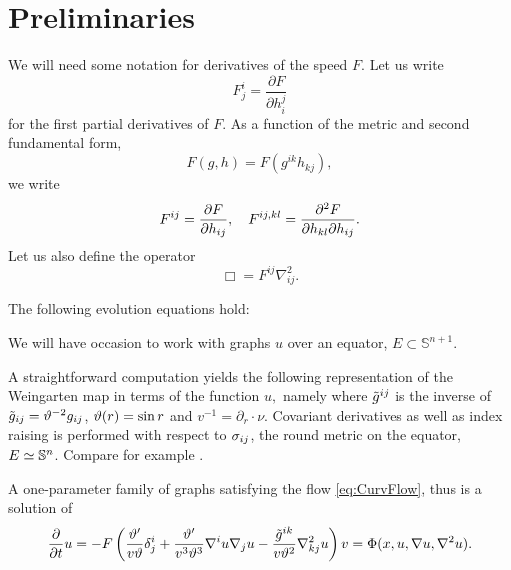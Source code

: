 \documentclass{amsart}
\begin{document}
\section{Preliminaries}\label{prelim}
\label{sec:prelim}

We will need some notation for derivatives of the speed \(F\). Let us write
\[
F^{i}_{j} = \frac{\partial F}{\partial h^{j}_{i}}
\]
for the first partial derivatives of \(F\). As a function of the metric and second fundamental form,
\[
F(g, h) = F(g^{ik} h_{kj}),
\]
we write
\[
F^{ij} = \frac{\partial F}{\partial h_{ij}}, \quad F^{ij,kl} = \fr{\partial^2F}{\partial h_{kl} \partial h_{ij}}.
\]
Let us also define the operator
\[
\Box = F^{ij} \nabla^2_{ij}.
\]
\begin{lemma} \label{lem: basi ev}
The following evolution equations hold:
\end{lemma}

We will have occasion to work with graphs \(u\) over an equator, \(E \subset \mathbb{S}^{n+1}\).

A straightforward computation yields the following representation of the Weingarten map in terms of the function $u,$ namely
where $\~g^{ij}$ is the inverse of $\~g_{ij}=\vt^{-2}g_{ij}$, $\vt(r)=\sin r$ and \(v^{-1} = \partial_r \cdot \nu\). Covariant derivatives as well as index raising is performed with respect to $\s_{ij}$, the round metric on the equator, \(E \simeq \S^n\). Compare for example \cite[(3.82)]{Scheuer:05/2015}.

A one-parameter family of graphs satisfying the flow \eqref{eq:CurvFlow}, thus is a solution of
\begin{equation}
\label{eq:GraphCurvFlow}
\fr{\del}{\del t}u=-F\br{\fr{\vt'}{v\vt}\d^{i}_{j}+\fr{\vt'}{v^{3}\vt^{3}}\nabla^{i}u\nabla_{j}u-\fr{\~g^{ik}}{v\vt^{2}}\nabla^{2}_{kj}u}v=\Phi(x,u,\nabla u,\nabla^{2}u).
\end{equation}

\begin{thm}
\label{thm:comparison}
\end{thm}
\end{document}

